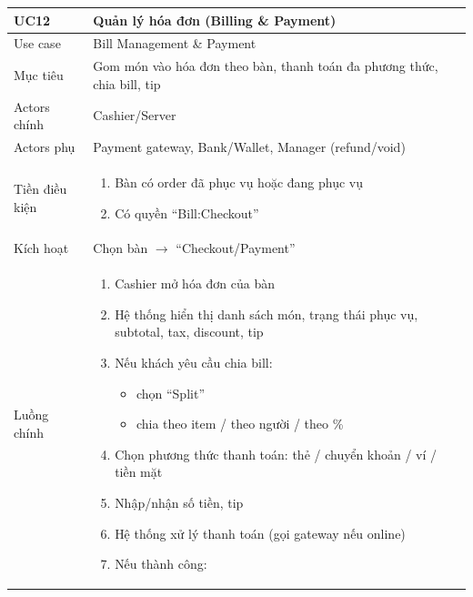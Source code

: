 \begin{longtable}{|>{\raggedright\arraybackslash}p{}|>{\raggedright\arraybackslash}p{}|}
\hline
\textbf{UC12} & \textbf{Quản lý hóa đơn (Billing \& Payment)} \\
\hline
Use case & Bill Management \& Payment \\
\hline
Mục tiêu & Gom món vào hóa đơn theo bàn, thanh toán đa phương thức, chia bill, tip \\
\hline
Actors chính & Cashier/Server \\
\hline
Actors phụ & Payment gateway, Bank/Wallet, Manager (refund/void) \\
\hline
Tiền điều kiện &
\vspace{-0.5em}
\begin{enumerate}[leftmargin=*]
\item Bàn có order đã phục vụ hoặc đang phục vụ
\item Có quyền “Bill:Checkout”
\end{enumerate}
\vspace{-0.5em}
\\
\hline
Kích hoạt & Chọn bàn $\rightarrow$ “Checkout/Payment” \\
\hline
Luồng chính &
\vspace{-0.5em}
\begin{enumerate}[leftmargin=*]
\item Cashier mở hóa đơn của bàn
\item Hệ thống hiển thị danh sách món, trạng thái phục vụ, subtotal, tax, discount, tip
\item Nếu khách yêu cầu chia bill:
\vspace{-0.5em}
\begin{itemize}[leftmargin=*]
\item chọn “Split”
\item chia theo item / theo người / theo \%
\end{itemize}
\vspace{-0.5em}
\item Chọn phương thức thanh toán: thẻ / chuyển khoản / ví / tiền mặt
\item Nhập/nhận số tiền, tip
\item Hệ thống xử lý thanh toán (gọi gateway nếu online)
\item Nếu thành công:
\vspace{-0.5em}
\begin{itemize}[leftmargin=*]

\end{itemize}
\end{enumerate}
\end{longtable}
